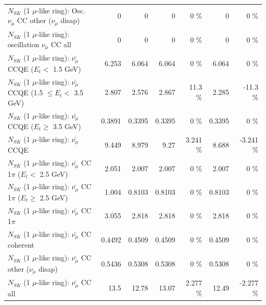 \begin{table}
\begin{tabular}{| l | r | r | r  r | r  r |}
         $N_{SK}$ (1 $\mu$-like ring): Osc. $\nu_\mu$ CC other ($\nu_\mu$ disap) &               0 &               0 &               0 &        0 \%  &               0 &        0 \%  \\ 
                      $N_{SK}$ (1 $\mu$-like ring): oscillation $\nu_\mu$ CC all &               0 &               0 &               0 &        0 \%  &               0 &        0 \%  \\ 
\hline
\hline
          $N_{SK}$ (1 $\mu$-like ring): $\bar{\nu_\mu}$ CCQE ($E_{t} <$ 1.5 GeV) &           6.253 &           6.064 &           6.064 &        0 \%  &           6.064 &        0 \%  \\ 
 $N_{SK}$ (1 $\mu$-like ring): $\bar{\nu_\mu}$ CCQE (1.5 $\leq E_{t} <$ 3.5 GeV) &           2.807 &           2.576 &           2.867 &     11.3 \%  &           2.285 &    -11.3 \%  \\ 
       $N_{SK}$ (1 $\mu$-like ring): $\bar{\nu_\mu}$ CCQE ($E_{t} \geq$ 3.5 GeV) &          0.3891 &          0.3395 &          0.3395 &        0 \%  &          0.3395 &        0 \%  \\ 
\hline
                              $N_{SK}$ (1 $\mu$-like ring): $\bar{\nu_\mu}$ CCQE &           9.449 &           8.979 &            9.27 &    3.241 \%  &           8.688 &   -3.241 \%  \\ 
\hline
     $N_{SK}$ (1 $\mu$-like ring): $\bar{\nu_\mu}$ CC 1$\pi$ ($E_{t} <$ 2.5 GeV) &           2.051 &           2.007 &           2.007 &        0 \%  &           2.007 &        0 \%  \\ 
  $N_{SK}$ (1 $\mu$-like ring): $\bar{\nu_\mu}$ CC 1$\pi$ ($E_{t} \geq$ 2.5 GeV) &           1.004 &          0.8103 &          0.8103 &        0 \%  &          0.8103 &        0 \%  \\ 
\hline
                         $N_{SK}$ (1 $\mu$-like ring): $\bar{\nu_\mu}$ CC 1$\pi$ &           3.055 &           2.818 &           2.818 &        0 \%  &           2.818 &        0 \%  \\ 
                       $N_{SK}$ (1 $\mu$-like ring): $\bar{\nu_\mu}$ CC coherent &          0.4492 &          0.4509 &          0.4509 &        0 \%  &          0.4509 &        0 \%  \\ 
        $N_{SK}$ (1 $\mu$-like ring): $\bar{\nu_\mu}$ CC other ($\nu_\mu$ disap) &          0.5436 &          0.5308 &          0.5308 &        0 \%  &          0.5308 &        0 \%  \\ 
                          $N_{SK}$ (1 $\mu$-like ring): $\bar{\nu_{\mu}}$ CC all &            13.5 &           12.78 &           13.07 &    2.277 \%  &           12.49 &   -2.277 \%  \\ 

\end{tabular}
\end{table}
